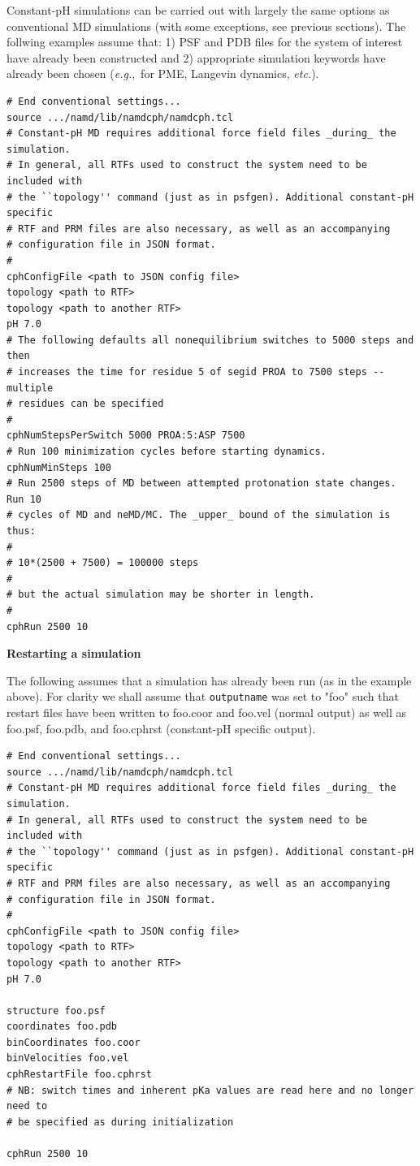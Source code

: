 Constant-pH simulations can be carried out with largely the same options as
  conventional MD simulations (with some exceptions, see previous sections).
The follwing examples assume that: 1) PSF and PDB files for the
  system of interest have already been constructed and 2) appropriate
  simulation keywords have already been chosen (\textit{e.g.},~for PME,
  Langevin dynamics, \textit{etc.}).
\begin{verbatim}
# End conventional settings...
source .../namd/lib/namdcph/namdcph.tcl
# Constant-pH MD requires additional force field files _during_ the simulation.
# In general, all RTFs used to construct the system need to be included with
# the ``topology'' command (just as in psfgen). Additional constant-pH specific
# RTF and PRM files are also necessary, as well as an accompanying
# configuration file in JSON format.
#
cphConfigFile <path to JSON config file>
topology <path to RTF>
topology <path to another RTF>
pH 7.0
# The following defaults all nonequilibrium switches to 5000 steps and then
# increases the time for residue 5 of segid PROA to 7500 steps -- multiple
# residues can be specified 
#
cphNumStepsPerSwitch 5000 PROA:5:ASP 7500
# Run 100 minimization cycles before starting dynamics.
cphNumMinSteps 100
# Run 2500 steps of MD between attempted protonation state changes. Run 10
# cycles of MD and neMD/MC. The _upper_ bound of the simulation is thus:
#
# 10*(2500 + 7500) = 100000 steps
#
# but the actual simulation may be shorter in length.
#
cphRun 2500 10
\end{verbatim}

\newpage
\noindent
\textbf{Restarting a simulation}

\noindent
The following assumes that a simulation has already been run (as in the example
  above).
For clarity we shall assume that \texttt{outputname} was set to "foo" such that
  restart files have been written to foo.coor and foo.vel (normal output) as
  well as foo.psf, foo.pdb, and foo.cphrst (constant-pH specific output).

\begin{verbatim}
# End conventional settings...
source .../namd/lib/namdcph/namdcph.tcl
# Constant-pH MD requires additional force field files _during_ the simulation.
# In general, all RTFs used to construct the system need to be included with
# the ``topology'' command (just as in psfgen). Additional constant-pH specific
# RTF and PRM files are also necessary, as well as an accompanying
# configuration file in JSON format.
#
cphConfigFile <path to JSON config file>
topology <path to RTF>
topology <path to another RTF>
pH 7.0

structure foo.psf
coordinates foo.pdb
binCoordinates foo.coor
binVelocities foo.vel
cphRestartFile foo.cphrst
# NB: switch times and inherent pKa values are read here and no longer need to
# be specified as during initialization

cphRun 2500 10
\end{verbatim}

